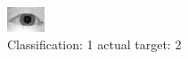 \begin{figure}[h!]
\begin{center}
\includegraphics[width=0.60\columnwidth]{figures/ID899_class_1_target_2.png}
\end{center}
\caption{ Classification: 1 actual target: 2}
\label{fig:ID899_class_1_target_2}
\end{figure}
